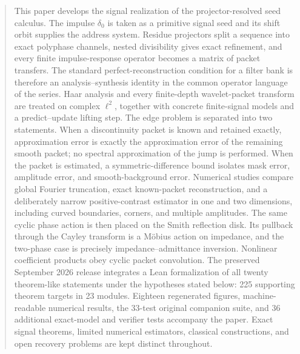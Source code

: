 \documentclass[11pt,a4paper]{article}
\theoremstyle{definition}
\theoremstyle{remark}
\begin{document}
\begin{abstract}
This paper develops the signal realization of the projector-resolved seed calculus. The impulse $\delta_0$ is taken as a primitive signal seed and its shift orbit supplies the address system. Residue projectors split a sequence into exact polyphase channels, nested divisibility gives exact refinement, and every finite impulse-response operator becomes a matrix of packet transfers. The standard perfect-reconstruction condition for a filter bank is therefore an analysis--synthesis identity in the common operator language of the series. Haar analysis and every finite-depth wavelet-packet transform are treated on complex $\ell^2$, together with concrete finite-signal models and a predict--update lifting step. The edge problem is separated into two statements. When a discontinuity packet is known and retained exactly, approximation error is exactly the approximation error of the remaining smooth packet; no spectral approximation of the jump is performed. When the packet is estimated, a symmetric-difference bound isolates mask error, amplitude error, and smooth-background error. Numerical studies compare global Fourier truncation, exact known-packet reconstruction, and a deliberately narrow positive-contrast estimator in one and two dimensions, including curved boundaries, corners, and multiple amplitudes. The same cyclic phase action is then placed on the Smith reflection disk. Its pullback through the Cayley transform is a M\"obius action on impedance, and the two-phase case is precisely impedance--admittance inversion. Nonlinear coefficient products obey cyclic packet convolution. The preserved September 2026 release integrates a Lean formalization of all twenty theorem-like statements under the hypotheses stated below: 225 supporting theorem targets in 23 modules. Eighteen regenerated figures, machine-readable numerical results, the 33-test original companion suite, and 36 additional exact-model and verifier tests accompany the paper. Exact signal theorems, limited numerical estimators, classical constructions, and open recovery problems are kept distinct throughout.
\end{abstract}
\end{document}
